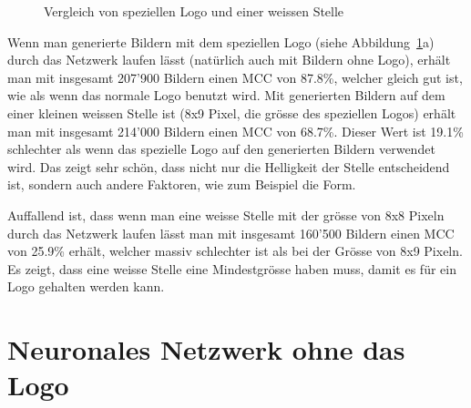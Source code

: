 \documentclass[12pt,a4paper]{report}
\begin{document}
\begin{figure}[h]%
    \centering
    \qquad
    \caption{Vergleich von speziellen Logo und einer weissen Stelle}
    \label{fig:white_square}%
\end{figure}

Wenn man generierte Bildern mit dem speziellen Logo (siehe Abbildung~\ref{fig:white_square}a) durch das Netzwerk laufen lässt (natürlich auch mit Bildern ohne Logo),
erhält man mit insgesamt 207'900 Bildern einen MCC von 87.8\%,
welcher gleich gut ist, wie als wenn das normale Logo benutzt wird.
Mit generierten Bildern auf dem einer kleinen weissen Stelle ist (8x9 Pixel, die grösse des speziellen Logos)
erhält man mit insgesamt 214'000 Bildern einen MCC von 68.7\%.
Dieser Wert ist 19.1\% schlechter als wenn das spezielle Logo auf den generierten Bildern verwendet wird.
Das zeigt sehr schön, dass nicht nur die Helligkeit der Stelle entscheidend ist, sondern auch andere Faktoren, wie zum Beispiel die Form.

Auffallend ist, dass wenn man eine weisse Stelle mit der grösse von 8x8 Pixeln durch das Netzwerk laufen lässt
man mit insgesamt 160'500 Bildern einen MCC von 25.9\% erhält,
welcher massiv schlechter ist als bei der Grösse von 8x9 Pixeln.
Es zeigt, dass eine weisse Stelle eine Mindestgrösse haben muss, damit es für ein Logo gehalten werden kann.

\section{Neuronales Netzwerk ohne das Logo}
\end{document}
